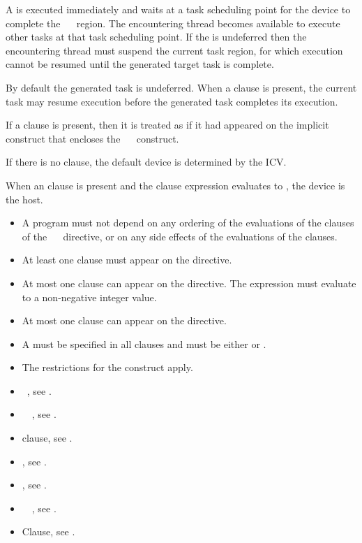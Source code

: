 A  is executed immediately and waits at a task scheduling point for the device to complete the ~~ region. The encountering thread becomes available to execute other tasks at that task scheduling point. If the  is undeferred then the encountering thread must suspend the current task region, for which execution cannot be resumed until the generated target task is complete.

By default the generated task is undeferred. When a  clause is present, the current task may resume execution before the generated task completes its execution.

If a  clause is present, then it is treated as if it had appeared on the implicit  construct that encloses the ~~ construct.

If there is no  clause, the default device is determined by the  ICV.

When an  clause is present and the  clause expression evaluates to , the device is the host. 

\restrictions
\begin{itemize}
\item A program must not depend on any ordering of the evaluations of the clauses of the ~~ directive, or on any side effects of the evaluations of the clauses.
\item At least one  clause must appear on the directive.
\item At most one  clause can appear on the directive. The  expression must evaluate to a non-negative integer value.
\item At most one  clause can appear on the directive.
\item A  must be specified in all  clauses and must be either  or .
\item The restrictions for the  construct apply. 
\end{itemize}

\crossreferences
\begin{itemize}
\item {}~, see .
\item {}~~, see .
\item {} clause, see .
\item {}, see .
\item {}, see .
\item {}~~, see . 
\item {} Clause, see .
\end{itemize}





